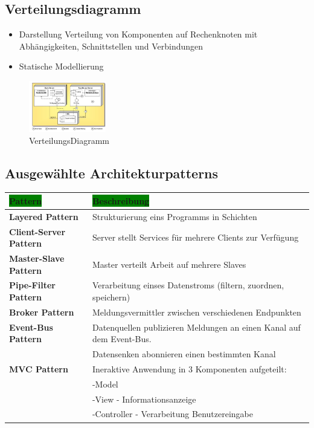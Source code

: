 \documentclass{article}
\begin{document}
\subsection{Verteilungsdiagramm} 

\begin{itemize}
	\item Darstellung Verteilung von Komponenten auf Rechenknoten mit Abhängigkeiten, Schnittstellen und Verbindungen
	\item Statische Modellierung
\end{itemize}

\begin{figure}[H]			\includegraphics[width=0.3\textwidth] {Resources/Images/VerteilungsDiagramm.png}
\caption{\label{fig:VerteilungsDiagramm}VerteilungsDiagramm}
\end{figure}


\subsection{Ausgewählte Architekturpatterns}

\begin{table} [H]

\begin{tabular}{l|l}

\colorbox{green}{\textbf{Pattern}} & \colorbox{green}{\textbf{Beschreibung}}

\\\hline
\textbf{Layered Pattern} & Strukturierung eins Programms in Schichten\\
\hline
\textbf{Client-Server Pattern} & Server stellt Services für mehrere Clients zur Verfügung\\
\hline
\textbf{Master-Slave Pattern} & Master verteilt Arbeit auf mehrere Slaves\\
\hline
\textbf{Pipe-Filter Pattern} & Verarbeitung einses Datenstroms (filtern, zuordnen, speichern)\\
\hline
\textbf{Broker Pattern} & Meldungsvermittler zwischen verschiedenen Endpunkten \\
\hline
\textbf{Event-Bus Pattern} & Datenquellen publizieren Meldungen an einen Kanal auf dem Event-Bus.\\ &Datensenken abonnieren einen bestimmten Kanal\\
\hline
\textbf{MVC Pattern} & Ineraktive Anwendung in 3 Komponenten aufgeteilt:\\
& -Model \\
& -View - Informationsanzeige \\
& -Controller - Verarbeitung Benutzereingabe
\end{tabular}
\end{table}
\end{document}
